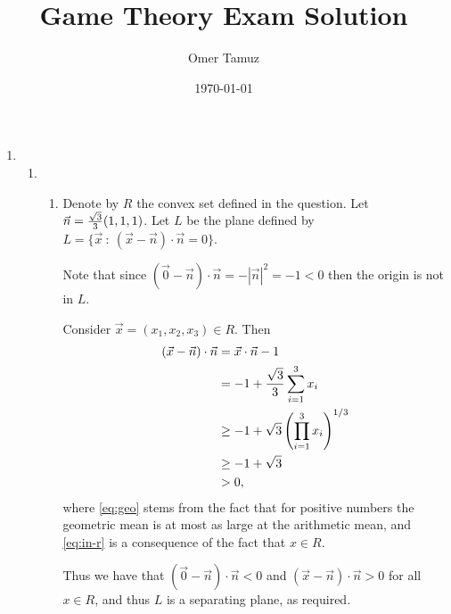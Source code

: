 \documentclass[11pt]{article} \usepackage{amssymb}
\begin{document}
\title{Game Theory Exam Solution}
\author{Omer Tamuz}
\date{\today}
\maketitle

\begin{enumerate}
\item
  \begin{enumerate}
  \item
    \begin{enumerate}
    \item Denote by $R$ the convex set defined in the question. Let
      $\vec{n}={\sqrt{3}\over 3} (1,1,1)$. Let $L$ be the plane defined by
      $L=\{\vec{x}\: : \: (\vec{x}-\vec{n}) \cdot \vec{n} = 0\}$.

      Note that since $(\vec{0}-\vec{n}) \cdot \vec{n} = -|\vec{n}|^2 = -1 <
      0$ then the origin is not in $L$.

      Consider $\vec{x}=(x_1, x_2, x_3) \in R$. Then
      \begin{align}
        (\vec{x}-\vec{n}) \cdot \vec{n} &= \vec{x} \cdot \vec{n} - 1
        \\ &= -1+{\sqrt{3}\over 3}\sum_{i=1}^3x_i
        \\ &\geq -1 + \sqrt{3}\left(\prod_{i=1}^3x_i\right)^{1/3} \label{eq:geo}
        \\ &\geq -1 + \sqrt{3} \label{eq:in-r}
        \\ &> 0,
      \end{align}
      where \eqref{eq:geo} stems from the fact that for positive
      numbers the geometric mean is at most as large at the arithmetic
      mean, and \eqref{eq:in-r} is a consequence of the fact
      that $x\in R$.

      Thus we have that $(\vec{0}-\vec{n}) \cdot \vec{n} < 0$ and
      $(\vec{x}-\vec{n}) \cdot \vec{n} > 0$ for all $x\in R$, and thus
      $L$ is a separating plane, as required.


\end{enumerate}
\end{enumerate}
\end{enumerate}
\end{document}
